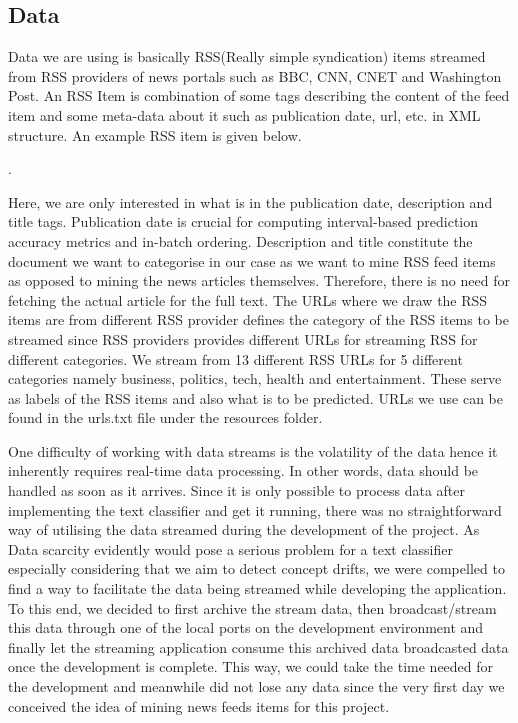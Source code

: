 \documentclass{article} %
\begin{document}
\subsection{Data}
Data we are using is basically RSS(Really simple syndication) items streamed from RSS providers of news portals such as BBC, CNN, CNET and Washington Post. An RSS Item is combination of some tags describing the content of the feed item and some meta-data about it such as publication date, url, etc. in XML structure. An example RSS item is given below.

    .

Here, we are only interested in what is in the publication date, description and title tags. Publication date is crucial for computing interval-based prediction accuracy metrics and in-batch ordering. Description and title constitute the document we want to categorise in our case as we want to mine RSS feed items as opposed to mining the news articles themselves. Therefore, there is no need for fetching the actual article for the full text. The URLs where we draw the RSS items are from different RSS provider defines the category of the RSS items to be streamed since RSS providers provides different URLs for streaming RSS for different categories. We stream from 13 different RSS URLs for 5 different categories namely business, politics, tech, health and entertainment. These serve as labels of the RSS items and also what is to be predicted. URLs we use can be found in the urls.txt file under the resources folder.

One difficulty of working with data streams is the volatility of the data hence it inherently requires real-time data processing. In other words,  data should be handled as soon as it arrives. Since it is only possible to process data after implementing the text classifier and get it running, there was no straightforward way of utilising the data streamed during the development of the project. As Data scarcity evidently would pose a serious problem for a text classifier especially considering that we aim to detect concept drifts, we were compelled to find a way to facilitate the data being streamed while developing the application. To this end, we decided to first archive the stream data, then broadcast/stream this data through one of the local ports on the development environment and finally let the streaming application consume this archived data broadcasted data once the development is complete. This way, we could take the time needed for the development and meanwhile did not lose any data since the very first day we conceived the idea of mining news feeds items for this project.
\end{document}
